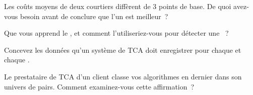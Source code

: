 \begin{interviewq}\label{iq:mx:transaction-cost-analysis:3}
Les coûts moyens de deux courtiers diffèrent de 3 points de base. De quoi avez-vous besoin avant de conclure que l'un est meilleur~?
\end{interviewq}

\begin{interviewq}\label{iq:mx:transaction-cost-analysis:4}
Que vous apprend le , et comment l'utiliseriez-vous pour détecter une ~?
\end{interviewq}

\begin{interviewq}\label{iq:mx:transaction-cost-analysis:5}
Concevez les données qu'un système de TCA doit enregistrer pour chaque  et chaque .
\end{interviewq}

\begin{interviewq}\label{iq:mx:transaction-cost-analysis:6}
Le prestataire de TCA d'un client classe vos algorithmes en dernier dans son univers de pairs. Comment examinez-vous cette affirmation~?
\end{interviewq}
